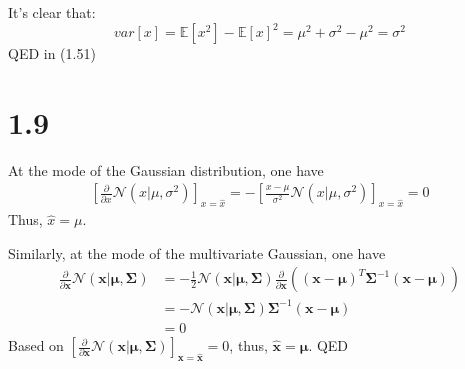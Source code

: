 \documentclass[10pt,a4paper,draft]{book}
\begin{document}
It's clear that:
\begin{equation}
var[x] = \mathbb{E}[x^2] - \mathbb{E}[x]^2 = \mu^2 + \sigma^2 - \mu^2 = \sigma^2
\end{equation}
QED in (1.51)

\section*{1.9}
At the mode of the Gaussian distribution, one have
\begin{equation}
\begin{aligned}
\left[\frac{\partial}{\partial x} \mathcal{N}(x|\mu,\sigma^2) \right]_{x=\hat{x}}= -\left[\frac{x-\mu}{\sigma^2} \mathcal{N}(x|\mu,\sigma^2) \right]_{x=\hat{x}}= 0
\end{aligned}
\end{equation}
Thus, $\hat{x} = \mu$.

Similarly, at the mode of the multivariate Gaussian, one have
\begin{equation}
\begin{aligned}
\frac{\partial}{\partial \bm{x}} \mathcal{N}(\bm{x}|\bm{\mu},\bm{\Sigma}) &= -\frac{1}{2}\mathcal{N}(\bm{x}|\bm{\mu},\bm{\Sigma}) \frac{\partial}{\partial \bm{x}} ((\bm{x}-\bm{\mu})^T\bm{\Sigma}^{-1}(\bm{x}-\bm{\mu}))  \\
&= -\mathcal{N}(\bm{x}|\bm{\mu},\bm{\Sigma}) \bm{\Sigma}^{-1}(\bm{x}-\bm{\mu}) \\
&= 0
\end{aligned}
\end{equation}
Based on $\left[\frac{\partial}{\partial \bm{x}} \mathcal{N}(\bm{x}|\bm{\mu},\bm{\Sigma})\right]_{\bm{x} = \hat{\bm{x}}} = 0$, thus, $\hat{\bm{x}} = \bm{\mu}$. QED
\end{document}
